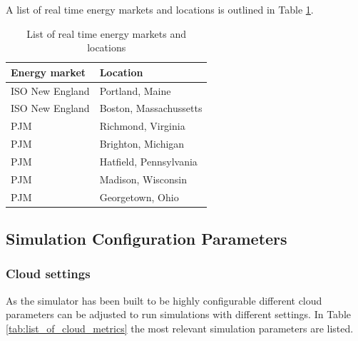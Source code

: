 A list of real time energy markets and locations is outlined in Table \ref{tab:list_of_real_time_markets}. 

\begin{table}[htbp]
\centering
\begin{tabular}{ll}
\toprule
 Energy market & Location \\
\midrule
	ISO New England &  Portland, Maine \\
	ISO New England &  Boston, Massachussetts \\
	PJM & Richmond, Virginia  \\
	PJM & Brighton, Michigan  \\
	PJM & Hatfield, Pennsylvania  \\
	PJM & Madison, Wisconsin  \\
	PJM & Georgetown, Ohio  \\
\bottomrule
\end{tabular}
\caption{List of real time energy markets and locations}
\label{tab:list_of_real_time_markets}
\end{table}





\subsection{Simulation Configuration Parameters} \label{ssec:simulation_configuration_parameters}

\subsubsection{Cloud settings}

As the simulator has been built to be highly configurable \cite{lucanin2015philharmonic} different cloud parameters can be adjusted to run simulations with different settings. In Table \ref{tab:list_of_cloud_metrics} the most relevant simulation parameters are listed. 

